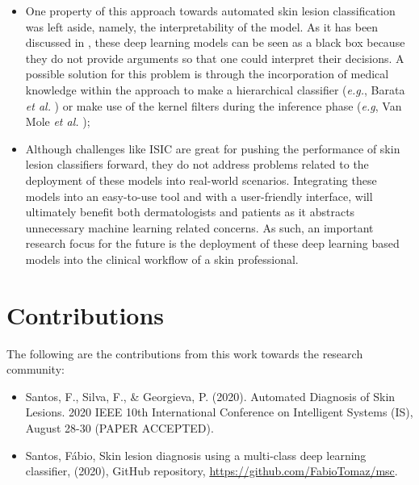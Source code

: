 \begin{itemize}
        \item One property of this approach towards automated skin lesion classification was left aside, namely, the interpretability of the model. As it has been discussed in , these deep learning models can be seen as a black box because they do not provide arguments so that one could interpret their decisions. A possible solution for this problem is through the incorporation of medical knowledge within the approach to make a hierarchical classifier (\textit{e.g.}, Barata \textit{et al.} \cite{Barata2020}) or make use of the kernel filters during the inference phase (\textit{e.g}, Van Mole \textit{et al.} \cite{VanMolle2018});
    
        \item Although challenges like \ac{ISIC} are great for pushing the performance of skin lesion classifiers forward, they do not address problems related to the deployment of these models into real-world scenarios. Integrating these models into an easy-to-use tool and with a user-friendly interface, will ultimately benefit both dermatologists and patients as it abstracts unnecessary machine learning related concerns. As such, an important research focus for the future is the deployment of these deep learning based models into the clinical workflow of a skin professional.
        
    \end{itemize}
    
\section{Contributions}
    The following are the contributions from this work towards the research community:
    \begin{itemize}
        \item Santos, F., Silva, F., \& Georgieva, P. (2020). Automated Diagnosis of Skin Lesions. 2020 IEEE 10th International Conference on Intelligent Systems (IS), August 28-30 (PAPER ACCEPTED).
        \item Santos, Fábio, Skin lesion diagnosis using a multi-class deep learning classifier, (2020), GitHub repository, \url{https://github.com/FabioTomaz/msc}.
    \end{itemize}